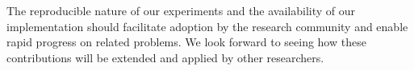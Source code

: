The reproducible nature of our experiments and the availability of our implementation should facilitate adoption by the research community and enable rapid progress on related problems. We look forward to seeing how these contributions will be extended and applied by other researchers.


